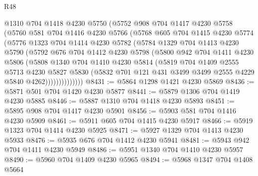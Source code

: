\begin{lexlean}{R48}
\begin{coremodule}
            @1310
            @704
            @1418
            @4230
            @5750
            (@5752
              @908
              @704
              @1417
              @4230
              @5758
              (@5760
                @581
                @704
                @1416
                @4230
                @5766
                (@5768
                  @605
                  @704
                  @1415
                  @4230
                  @5774
                  (@5776
                    @1323
                    @704
                    @1414
                    @4230
                    @5782
                    (@5784
                      @1329
                      @704
                      @1413
                      @4230
                      @5790
                      (@5792
                        @676
                        @704
                        @1412
                        @4230
                        @5798
                        (@5800
                          @942
                          @704
                          @1411
                          @4230
                          @5806
                          (@5808
                            @1340
                            @704
                            @1410
                            @4230
                            @5814
                            (@5819
                              @704
                              @1409
                              @2555
                              @5713
                              @4230
                              @5827
                              @5830
                              (@5832
                                @701
                                @121
                                @431
                                @3499
                                @3499
                                @2555
                                @4229
                                @5840
                                @4262))))))))))))))
@8431 := @5864 @1298 @1421 @4230 @5869
@8436 := @5871 @501 @704 @1420 @4230 @5877
@8441 := @5879 @1306 @704 @1419 @4230 @5885
@8446 := @5887 @1310 @704 @1418 @4230 @5893
@8451 := @5895 @908 @704 @1417 @4230 @5901
@8456 := @5903 @581 @704 @1416 @4230 @5909
@8461 := @5911 @605 @704 @1415 @4230 @5917
@8466 := @5919 @1323 @704 @1414 @4230 @5925
@8471 := @5927 @1329 @704 @1413 @4230 @5933
@8476 := @5935 @676 @704 @1412 @4230 @5941
@8481 := @5943 @942 @704 @1411 @4230 @5949
@8486 := @5951 @1340 @704 @1410 @4230 @5957
@8490 := @5960 @704 @1409 @4230 @5965
@8494 := @5968 @1347 @704 @1408 @5664

\end{coremodule}
\end{lexlean}
